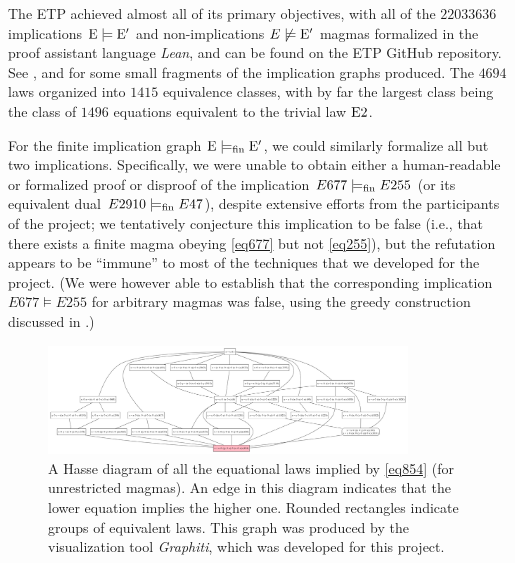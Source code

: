 The ETP achieved almost all of its primary objectives, with all of the $\num{22033636}$ implications ${\mathrm{E}} \models {\mathrm{E}'}$ and non-implications $E \not \models {\mathrm{E}'}$ magmas formalized in the proof assistant language \emph{Lean}, and can be found on the ETP GitHub repository.  See ,  and  for some small fragments of the implication graphs produced.
The $\num{4694}$ laws organized into $\num{1415}$ equivalence classes, with by far the largest class being the class of $\num{1496}$ equations equivalent to the trivial law $\mathrm{E}2$.

For the finite implication graph ${\mathrm{E}} \models_{\mathrm{fin}} {\mathrm{E}'}$, we could similarly formalize all but two implications.  Specifically, we were unable to obtain either a human-readable or formalized proof or disproof of the implication $E677 \models_{\mathrm{fin}} E255$ (or its equivalent dual $E2910 \models_{\mathrm{fin}} E47$), despite extensive efforts from the participants of the project; we tentatively conjecture this implication to be false (i.e., that there exists a finite magma obeying \eqref{eq677} but not \eqref{eq255}), but the refutation appears to be ``immune'' to most of the techniques that we developed for the project.  (We were however able to establish that the corresponding implication $E677 \models E255$ for arbitrary magmas was false, using the greedy construction discussed in .)

\begin{figure}
\centering
\includegraphics[width=0.85\textwidth]{854.png}
\caption{A Hasse diagram of all the equational laws implied by \eqref{eq854} (for unrestricted magmas).  An edge in this diagram indicates that the lower equation implies the higher one. Rounded rectangles indicate groups of equivalent laws.  This graph was produced by the visualization tool \emph{Graphiti}, which was developed for this project.}
\label{fig:854}
\end{figure}

